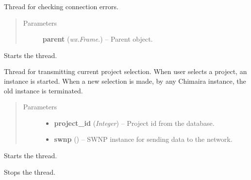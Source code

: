 \documentclass[letterpaper,10pt,english]{sphinxmanual}
\begin{document}

\begin{fulllineitems}
\label{wos:wos.CONN_ERR_TH}
Thread for checking connection errors.
\begin{quote}\begin{description}
\item[{Parameters}] \leavevmode
\textbf{parent} (\emph{wx.Frame.}) -- Parent object.

\end{description}\end{quote}

\begin{fulllineitems}
\label{wos:wos.CONN_ERR_TH.run}
Starts the thread.

\end{fulllineitems}


\end{fulllineitems}


\begin{fulllineitems}
\label{wos:wos.CURRENT_PROJECT}
Thread for transmitting current project selection.
When user selects a project, an instance is started.
When a new selection is made, by any Chimaira instance,
the old instance is terminated.
\begin{quote}\begin{description}
\item[{Parameters}] \leavevmode\begin{itemize}
\item {} 
\textbf{project\_id} (\emph{Integer}) -- Project id from the database.

\item {} 
\textbf{swnp} ({\hyperref[swnp:swnp.SWNP]{}}) -- SWNP instance for sending data to the network.

\end{itemize}

\end{description}\end{quote}

\begin{fulllineitems}
\label{wos:wos.CURRENT_PROJECT.run}
Starts the thread.

\end{fulllineitems}


\begin{fulllineitems}
\label{wos:wos.CURRENT_PROJECT.stop}
Stops the thread.

\end{fulllineitems}


\end{fulllineitems}
\end{document}
